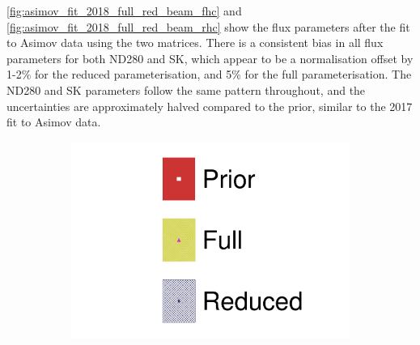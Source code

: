 \autoref{fig:asimov_fit_2018_full_red_beam_fhc} and \autoref{fig:asimov_fit_2018_full_red_beam_rhc} show the flux parameters after the fit to Asimov data using the two matrices. There is a consistent bias in all flux parameters for both ND280 and SK, which appear to be a normalisation offset by 1-2\% for the reduced parameterisation, and 5\% for the full parameterisation. The ND280 and SK parameters follow the same pattern throughout, and the uncertainties are approximately halved compared to the prior, similar to the 2017 fit to Asimov data.
\begin{figure}[h]
	\centering
	\begin{subfigure}[t]{0.10\textwidth}
		\includegraphics[width=\textwidth,page=1, trim={0mm 0mm 0mm 9mm}, clip]{figures/mach3/2018/asimov/2018a_FixedCov_FullCov_Mpi_Asimov_merg_2018a_FixedCov_RedCov_Mpi_Asimov_merge}
	\end{subfigure}


\end{figure}
